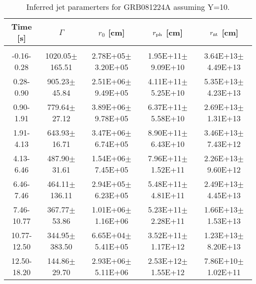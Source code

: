 \begin{table}[htp]
\scriptsize
\label{tab:}
\begin{tabular}{c c c c c}
Time [s] & $\Gamma$ & $r_0$ [cm] & $r_{\rm ph}$ [cm] & $r_{\rm nt}$ [cm] \\
\hline \hline\\ 

-0.16-0.28 & 1020.05$\pm$165.51 & 2.78E+05$\pm$3.20E+05 & 1.95E+11$\pm$9.09E+10 & 3.64E+13$\pm$4.49E+13 \\ 

0.28-0.90 & 905.23$\pm$45.84 & 2.51E+06$\pm$9.49E+05 & 4.11E+11$\pm$5.25E+10 & 5.35E+13$\pm$4.23E+13 \\ 

0.90-1.91 & 779.64$\pm$27.12 & 3.89E+06$\pm$9.78E+05 & 6.37E+11$\pm$5.58E+10 & 2.69E+13$\pm$1.31E+13 \\ 

1.91-4.13 & 643.93$\pm$16.71 & 3.47E+06$\pm$6.74E+05 & 8.90E+11$\pm$6.43E+10 & 3.46E+13$\pm$7.43E+12 \\ 

4.13-6.46 & 487.90$\pm$31.61 & 1.54E+06$\pm$7.45E+05 & 7.96E+11$\pm$1.52E+11 & 2.26E+13$\pm$9.60E+12 \\ 

6.46-7.46 & 464.11$\pm$136.11 & 2.94E+05$\pm$6.23E+05 & 5.48E+11$\pm$4.81E+11 & 2.49E+13$\pm$4.45E+13 \\ 

7.46-10.77 & 367.77$\pm$53.86 & 1.01E+06$\pm$1.16E+06 & 5.23E+11$\pm$2.28E+11 & 1.66E+13$\pm$1.53E+13 \\ 

10.77-12.50 & 344.95$\pm$383.50 & 6.65E+04$\pm$5.41E+05 & 3.52E+11$\pm$1.17E+12 & 1.23E+13$\pm$8.20E+13 \\ 

12.50-18.20 & 144.86$\pm$29.70 & 2.93E+06$\pm$5.11E+06 & 2.53E+12$\pm$1.55E+12 & 7.86E+10$\pm$1.02E+11 \\ 

\end{tabular}
\caption{Inferred jet paramerters for GRB081224A assuming Y=10.}
\end{table}
